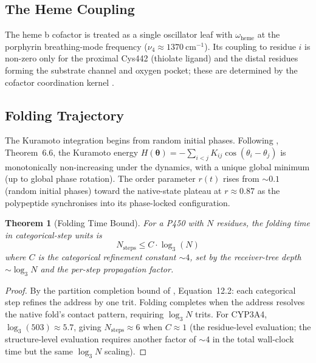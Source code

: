\documentclass[11pt,twocolumn,a4paper]{article}
\newtheorem{theorem}{Theorem}[section]
\theoremstyle{definition}
\theoremstyle{remark}
\newcommand{\orderpar}{r}
\newcommand{\phvec}{\boldsymbol{\theta}}
\begin{document}
\subsection{The Heme Coupling}

The heme b cofactor is treated as a single oscillator leaf with $\omega_{\mathrm{heme}}$ at the porphyrin breathing-mode frequency ($\nu_4 \approx 1370~\mathrm{cm}^{-1}$). Its coupling to residue $i$ is non-zero only for the proximal Cys442 (thiolate ligand) and the distal residues forming the substrate channel and oxygen pocket; these are determined by the cofactor coordination kernel \citep{sachikonye2025_paper1}.

\subsection{Folding Trajectory}

The Kuramoto integration begins from random initial phases. Following \citep{sachikonye2025fold}, Theorem~6.6, the Kuramoto energy $H(\phvec) = -\sum_{i<j} K_{ij}\cos(\theta_i - \theta_j)$ is monotonically non-increasing under the dynamics, with a unique global minimum (up to global phase rotation). The order parameter $\orderpar(t)$ rises from $\sim 0.1$ (random initial phases) toward the native-state plateau at $\orderpar \approx 0.87$ as the polypeptide synchronises into its phase-locked configuration.

\begin{theorem}[Folding Time Bound]
\label{thm:folding_time}
For a P450 with $N$ residues, the folding time in categorical-step units is
\begin{equation}
N_{\mathrm{steps}} \leq C \cdot \log_3(N)
\end{equation}
where $C$ is the categorical refinement constant $\sim 4$, set by the receiver-tree depth $\sim \log_3 N$ and the per-step propagation factor.
\end{theorem}

\begin{proof}
By the partition completion bound of \citep{sachikonye2025c}, Equation~12.2: each categorical step refines the address by one trit. Folding completes when the address resolves the native fold's contact pattern, requiring $\log_3 N$ trits. For CYP3A4, $\log_3(503) \approx 5.7$, giving $N_{\mathrm{steps}} \approx 6$ when $C \approx 1$ (the residue-level evaluation; the structure-level evaluation requires another factor of $\sim 4$ in the total wall-clock time but the same $\log_3 N$ scaling).
\end{proof}
\end{document}
